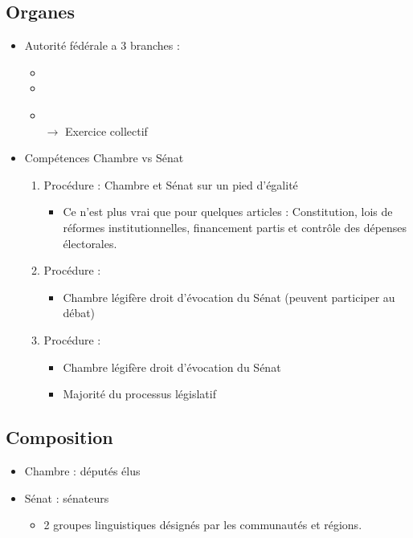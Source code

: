 \subsection{Organes}
\begin{itemize}
	\item Autorité fédérale a 3 branches :
	\begin{itemize}
		\item {}
		\item {}
		\item {}\\
		$\rightarrow$ Exercice collectif
	\end{itemize}
	\item Compétences Chambre vs Sénat
	\begin{enumerate}
		\item Procédure  : Chambre et Sénat sur un pied d'égalité
		\begin{itemize}
			\item Ce n'est plus vrai que pour quelques articles : Constitution, lois de réformes institutionnelles, financement partis et contrôle des dépenses électorales.
		\end{itemize}
		\item Procédure  :
		\begin{itemize}
			\item Chambre légifère  droit d'évocation du Sénat (peuvent participer au débat)
		\end{itemize}
		\item Procédure  :
		\begin{itemize}
			\item Chambre légifère  droit d'évocation du Sénat
			\item Majorité du processus législatif
		\end{itemize}
	\end{enumerate}
\end{itemize}

\subsection{Composition}
\begin{itemize}
	\item Chambre :  députés élus
	\item Sénat :  sénateurs
	\begin{itemize}
		\item 2 groupes linguistiques désignés par les communautés et régions.
	\end{itemize}
\end{itemize}

